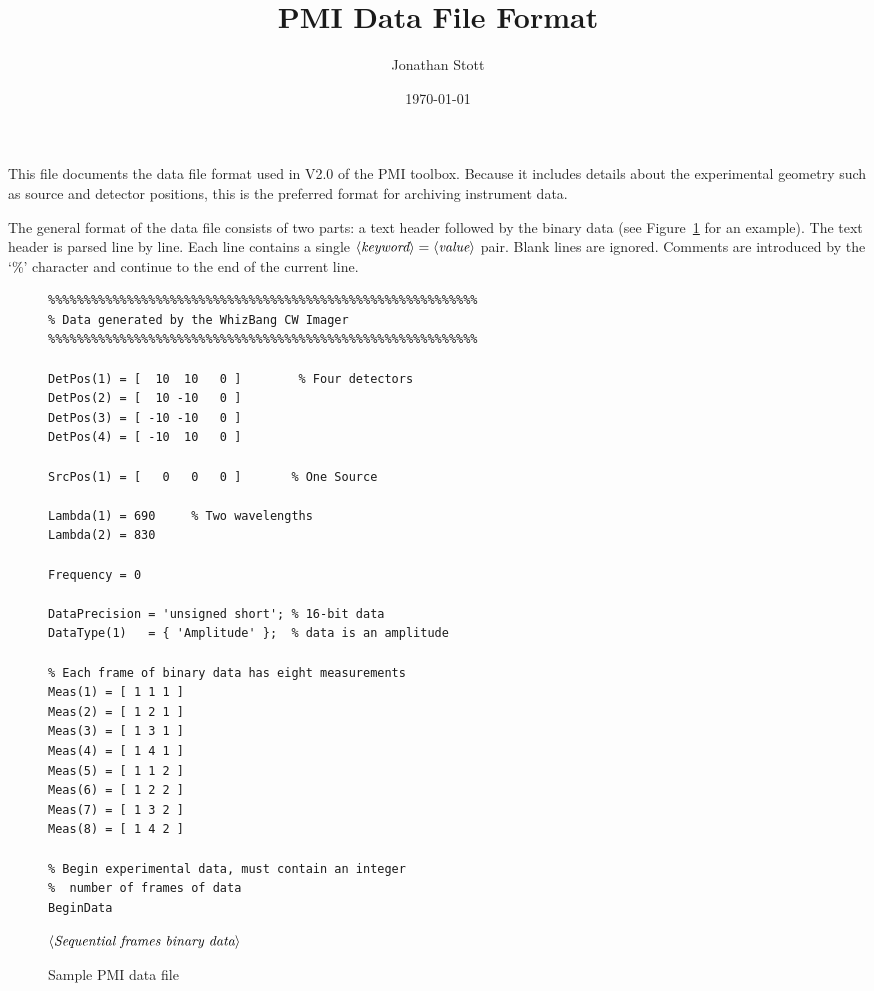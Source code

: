 \documentclass[12pt]{article}
\newcommand{\keyword}[1]{\mbox{$\left<\mbox{\it #1}\right>$}\/}
\begin{document}
\title{PMI Data File Format}
\author{Jonathan Stott}
\date{\today}

\maketitle

This file documents the data file format used in V2.0 of the PMI
toolbox.  Because it includes details about the experimental geometry
such as source and detector positions, this is the preferred format
for archiving instrument data.

The general format of the data file consists of two parts: a text
header followed by the binary data (see Figure~\ref{fig:sample_file}
for an example).  The text header is parsed line by
line.  Each line contains a single $\keyword{keyword}=\keyword{value}$
pair.  Blank lines are ignored.  Comments are introduced by the `\%'
character and continue to the end of the current line.

\begin{figure}[p]
\begin{verbatim}
%%%%%%%%%%%%%%%%%%%%%%%%%%%%%%%%%%%%%%%%%%%%%%%%%%%%%%%%%%%%
% Data generated by the WhizBang CW Imager
%%%%%%%%%%%%%%%%%%%%%%%%%%%%%%%%%%%%%%%%%%%%%%%%%%%%%%%%%%%%

DetPos(1) = [  10  10   0 ]        % Four detectors
DetPos(2) = [  10 -10   0 ]
DetPos(3) = [ -10 -10   0 ]
DetPos(4) = [ -10  10   0 ]

SrcPos(1) = [   0   0   0 ]       % One Source

Lambda(1) = 690     % Two wavelengths
Lambda(2) = 830

Frequency = 0

DataPrecision = 'unsigned short'; % 16-bit data
DataType(1)   = { 'Amplitude' };  % data is an amplitude

% Each frame of binary data has eight measurements
Meas(1) = [ 1 1 1 ]
Meas(2) = [ 1 2 1 ]
Meas(3) = [ 1 3 1 ]
Meas(4) = [ 1 4 1 ]
Meas(5) = [ 1 1 2 ]
Meas(6) = [ 1 2 2 ]
Meas(7) = [ 1 3 2 ]
Meas(8) = [ 1 4 2 ]

% Begin experimental data, must contain an integer
%  number of frames of data
BeginData
\end{verbatim}
\keyword{Sequential frames binary data}
\caption{Sample PMI data file}
\label{fig:sample_file}
\end{figure}

\end{document}
